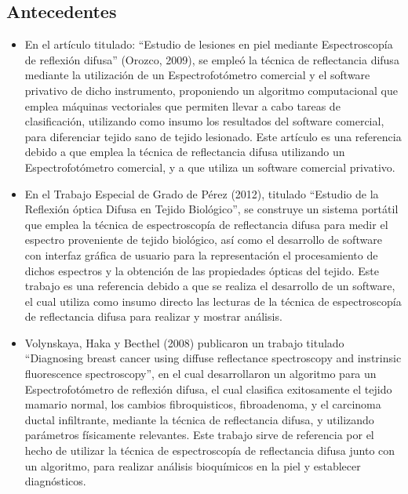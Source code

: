 \documentclass[12pt, a4paper]{article}
\begin{document}
\subsection{Antecedentes}	
	\begin{itemize}
		\item En el art\'{i}culo titulado: “Estudio de lesiones en piel mediante Espectroscop\'{i}a de reflexi\'{o}n difusa” (Orozco, 2009), se emple\'{o} la t\'{e}cnica de reflectancia difusa mediante la utilizaci\'{o}n de un Espectrofot\'{o}metro comercial y el software privativo de dicho instrumento, proponiendo un algoritmo computacional que emplea m\'{a}quinas vectoriales que permiten llevar a cabo tareas de clasificaci\'{o}n, utilizando como insumo los resultados del software comercial, para diferenciar tejido sano de tejido lesionado. Este art\'{i}culo es una referencia debido a que emplea la t\'{e}cnica de reflectancia difusa utilizando un Espectrofot\'{o}metro comercial, y a que utiliza un software comercial privativo.
		\item En el Trabajo Especial de Grado de P\'{e}rez (2012), titulado “Estudio de la Reflexi\'{o}n \'{o}ptica Difusa en Tejido Biol\'{o}gico”, se construye un sistema port\'{a}til que emplea la t\'{e}cnica de espectroscop\'{i}a de reflectancia difusa para medir el espectro proveniente de tejido biol\'{o}gico, as\'{i} como el desarrollo de software con interfaz gr\'{a}fica de usuario para la representaci\'{o}n el procesamiento de dichos espectros y la obtenci\'{o}n de las propiedades \'{o}pticas del tejido. Este trabajo es una referencia debido a que se realiza el desarrollo de un software, el cual utiliza como insumo directo las lecturas de la t\'{e}cnica de espectroscop\'{i}a de reflectancia difusa para realizar y mostrar an\'{a}lisis.
		\item Volynskaya, Haka y Becthel (2008) publicaron un trabajo titulado “Diagnosing breast cancer using diffuse reflectance spectroscopy and instrinsic fluorescence spectroscopy”, en el cual desarrollaron un algoritmo para un Espectrofot\'{o}metro de reflexi\'{o}n difusa, el cual clasifica exitosamente el tejido mamario normal, los cambios fibroquisticos, fibroadenoma, y el carcinoma ductal infiltrante, mediante la t\'{e}cnica de reflectancia difusa, y utilizando par\'{a}metros f\'{i}sicamente relevantes. Este trabajo sirve de referencia por el hecho de utilizar la t\'{e}cnica de espectroscop\'{i}a de reflectancia difusa junto con un algoritmo, para realizar an\'{a}lisis bioqu\'{i}micos en la piel y establecer diagn\'{o}sticos.
	\end{itemize}
\end{document}
